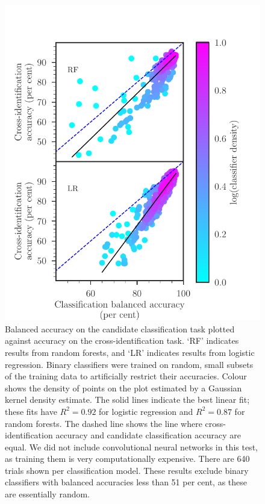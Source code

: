 \documentclass[11pt, a4paper]{book}
\begin{document}
    \begin{figure}
      \centering
      \includegraphics[width=0.6\columnwidth]{atlas-images/gct-to-xid.pdf}
      \caption[Balanced accuracy on the candidate classification task plotted
      against accuracy on the cross-identification task.]{Balanced accuracy on the candidate classification task plotted
      against accuracy on the cross-identification task. `RF' indicates
      results from random forests, and `LR' indicates results from logistic
      regression. Binary classifiers were trained on random, small subsets of the
      training data to artificially restrict their accuracies. Colour shows
      the density of points on the plot estimated by a Gaussian kernel density
      estimate. The solid lines indicate the best linear fit; these fits have
      $R^2 = 0.92$ for logistic regression and $R^2 = 0.87$ for random
      forests.
      {The dashed line shows the line where cross-identification accuracy and candidate classification accuracy are equal.}
      We did not include convolutional neural networks in this test,
      as training them is very computationally expensive. There are 640 trials shown per classification model. These results
      exclude binary classifiers with balanced accuracies less than 51 per cent, as
      these are essentially random.
      \label{fig:gct-to-xid}}
    \end{figure}
\end{document}
